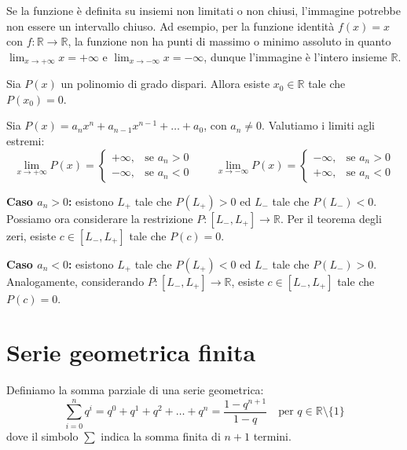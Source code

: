 \documentclass[12pt]{report}
\newcommand{\R}{\mathbb{R}}
\begin{document}
	Se la funzione è definita su insiemi non limitati o non chiusi, l'immagine potrebbe non essere un intervallo chiuso. Ad esempio, per la funzione identità $f(x) = x$ con $f: \R \to \R$, la funzione non ha punti di massimo o minimo assoluto in quanto $\lim_{x \to +\infty} x = +\infty$ e $\lim_{x \to -\infty} x = -\infty$, dunque l'immagine è l'intero insieme $\R$.
	
	\begin{proposizione}{}{}
		
		Sia $P(x)$ un polinomio di grado dispari. Allora esiste $x_0 \in \R$ tale che $P(x_0) = 0$.
		
	\end{proposizione}
	
	\begin{dimostrazione}{}{}
		
		Sia $P(x) = a_n x^n + a_{n-1} x^{n-1} + \dots + a_0$, con $a_n \neq 0$.
		Valutiamo i limiti agli estremi:
		\[
		\lim_{x \to +\infty} P(x) = \begin{cases}
			+\infty, &\text{se } a_n > 0 \\
			-\infty, &\text{se } a_n < 0
		\end{cases}
		\qquad
		\lim_{x \to -\infty} P(x) = \begin{cases}
			-\infty, &\text{se } a_n > 0 \\
			+\infty, &\text{se } a_n < 0
		\end{cases}
		\]
		
		\textbf{Caso $a_n > 0$:} esistono $L_+$ tale che $P(L_+) > 0$ ed $L_-$ tale che $P(L_-) < 0$. 
		Possiamo ora considerare la restrizione $P: [L_-, L_+] \to \R$. Per il teorema degli zeri, esiste $c \in [L_-, L_+]$ tale che $P(c) = 0$.
		
		\textbf{Caso $a_n < 0$:} esistono $L_+$ tale che $P(L_+) < 0$ ed $L_-$ tale che $P(L_-) > 0$. 
		Analogamente, considerando $P: [L_-, L_+] \to \R$, esiste $c \in [L_-, L_+]$ tale che $P(c) = 0$.
		
	\end{dimostrazione}
	
	\section{Serie geometrica finita}
	
	Definiamo la somma parziale di una serie geometrica:
	\[
	\sum_{i=0}^{n} q^i = q^0 + q^1 + q^2 + \dots + q^n = \frac{1 - q^{n+1}}{1 - q} \quad \text{per } q \in \R \setminus \{1\}
	\]
	dove il simbolo $\sum$ indica la somma finita di $n+1$ termini.
	
\end{document}
